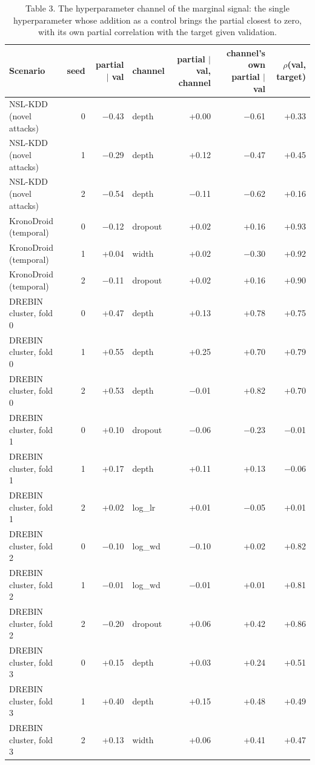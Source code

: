 \begin{table}[t]
\centering\small
\caption{Table 3. The hyperparameter channel of the marginal signal: the single hyperparameter whose addition as a control brings the partial closest to zero, with its own partial correlation with the target given validation.}
\label{tab:channels}
\begin{tabular}{lrrlrrr}
\toprule
Scenario & seed & partial $\mid$ val & channel & partial $\mid$ val, channel & channel's own partial $\mid$ val & $\rho$(val, target) \\
\midrule
NSL-KDD (novel attacks) & 0 & $-$0.43 & depth & +0.00 & $-$0.61 & +0.33 \\
NSL-KDD (novel attacks) & 1 & $-$0.29 & depth & +0.12 & $-$0.47 & +0.45 \\
NSL-KDD (novel attacks) & 2 & $-$0.54 & depth & $-$0.11 & $-$0.62 & +0.16 \\
KronoDroid (temporal) & 0 & $-$0.12 & dropout & +0.02 & +0.16 & +0.93 \\
KronoDroid (temporal) & 1 & +0.04 & width & +0.02 & $-$0.30 & +0.92 \\
KronoDroid (temporal) & 2 & $-$0.11 & dropout & +0.02 & +0.16 & +0.90 \\
DREBIN cluster, fold 0 & 0 & +0.47 & depth & +0.13 & +0.78 & +0.75 \\
DREBIN cluster, fold 0 & 1 & +0.55 & depth & +0.25 & +0.70 & +0.79 \\
DREBIN cluster, fold 0 & 2 & +0.53 & depth & $-$0.01 & +0.82 & +0.70 \\
DREBIN cluster, fold 1 & 0 & +0.10 & dropout & $-$0.06 & $-$0.23 & $-$0.01 \\
DREBIN cluster, fold 1 & 1 & +0.17 & depth & +0.11 & +0.13 & $-$0.06 \\
DREBIN cluster, fold 1 & 2 & +0.02 & log\_lr & +0.01 & $-$0.05 & +0.01 \\
DREBIN cluster, fold 2 & 0 & $-$0.10 & log\_wd & $-$0.10 & +0.02 & +0.82 \\
DREBIN cluster, fold 2 & 1 & $-$0.01 & log\_wd & $-$0.01 & +0.01 & +0.81 \\
DREBIN cluster, fold 2 & 2 & $-$0.20 & dropout & +0.06 & +0.42 & +0.86 \\
DREBIN cluster, fold 3 & 0 & +0.15 & depth & +0.03 & +0.24 & +0.51 \\
DREBIN cluster, fold 3 & 1 & +0.40 & depth & +0.15 & +0.48 & +0.49 \\
DREBIN cluster, fold 3 & 2 & +0.13 & width & +0.06 & +0.41 & +0.47 \\

\end{tabular}
\end{table}
